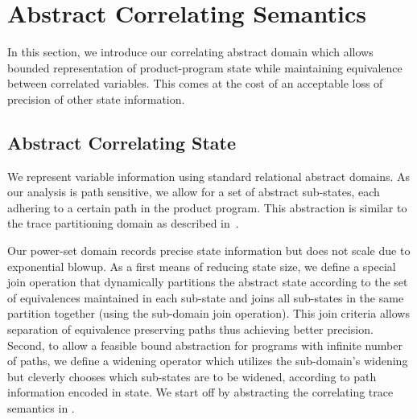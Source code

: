 \section{Abstract Correlating Semantics}

In this section, we introduce our correlating abstract domain which allows bounded representation of product-program state while maintaining equivalence between correlated variables. This comes at the cost of an acceptable loss of precision of other state information. 

\subsection{Abstract Correlating State}

We represent variable information using standard relational abstract domains. As our analysis is path sensitive, we allow for a set of abstract sub-states, each adhering to a certain path in the product program. This abstraction is similar to the trace partitioning domain as described in~\cite{MauborgneRival07}. 

Our power-set domain records precise state information but does not scale due to exponential blowup. As a first means of reducing state size, we define a special join operation that dynamically partitions the abstract state according to the set of equivalences maintained in each sub-state and joins all sub-states in the same partition together (using the sub-domain join operation). This join criteria allows separation of equivalence preserving paths thus achieving better precision. Second, to allow a feasible bound abstraction for programs with infinite number of paths, we define a widening operator which utilizes the sub-domain's widening but cleverly chooses which sub-states are to be widened, according to path information encoded in state.
We start off by abstracting the correlating trace semantics in .

